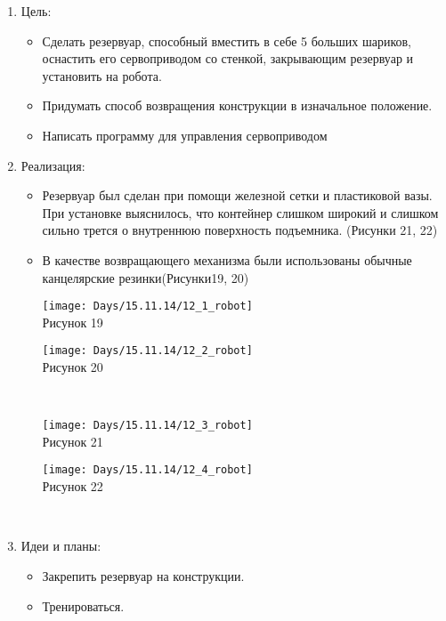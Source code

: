 \begin{enumerate}
	\item Цель:
		\begin{itemize}
			\item Сделать резервуар, способный вместить в себе 5 больших шариков, оснастить его сервоприводом со стенкой, закрывающим резервуар и установить на робота.
			\item Придумать способ возвращения конструкции в изначальное положение.
			\item Написать программу для управления сервоприводом 
		\end{itemize}
	\item Реализация:
		\begin{itemize}
			\item Резервуар был сделан при помощи железной сетки и пластиковой вазы. При установке выяснилось, что контейнер слишком широкий и слишком сильно трется о внутреннюю поверхность подъемника. (Рисунки 21, 22)
			\item В качестве возвращающего механизма были использованы обычные канцелярские резинки(Рисунки19, 20)\\
			\begin{minipage}{0.3\linewidth}
			\texttt{[image: Days/15.11.14/12\_1\_robot]}\\ Рисунок 19
			\end{minipage}
			\begin{minipage}{0.3\linewidth}
			\texttt{[image: Days/15.11.14/12\_2\_robot]}\\ Рисунок 20
			\end{minipage}\\
			\begin{minipage}{0.3\linewidth}
			\texttt{[image: Days/15.11.14/12\_3\_robot]}\\ Рисунок 21
			\end{minipage}
			\begin{minipage}{0.3\linewidth}
			\texttt{[image: Days/15.11.14/12\_4\_robot]}\\ Рисунок 22
			\end{minipage}\\
		\end{itemize}
	\item Идеи и планы:
		\begin{itemize}
			\item Закрепить резервуар на конструкции.
			\item Тренироваться.
		\end{itemize}
		\fillpage
\end{enumerate}